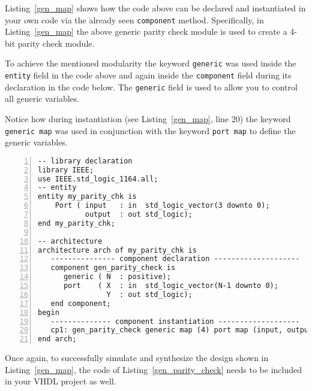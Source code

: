 Listing~\ref{gen_map} shows how the code above can be declared and instantiated in your own code via the already seen \texttt{component} method. Specifically, in Listing~\ref{gen_map} the above generic parity check module is used to create a 4-bit parity check module.

To achieve the mentioned modularity the keyword \texttt{generic} was used inside the \texttt{entity} field in the code above and again inside the \texttt{component} field during its declaration in the code below. The \texttt{generic} field is used to allow you to control all generic variables.

Notice how during instantiation (see Listing~\ref{gen_map}, line 20) the keyword \texttt{generic map} was used in conjunction with the keyword \texttt{port map} to define the generic variables.

\noindent
\begin{minipage}{0.99\linewidth}
\begin{lstlisting}[numbers=left, label=gen_map, caption=Use of \texttt{generic} for the construct of a generic parity check code.]
-- library declaration
library IEEE;
use IEEE.std_logic_1164.all;
-- entity
entity my_parity_chk is
    Port ( input   : in  std_logic_vector(3 downto 0);
           output  : out std_logic);
end my_parity_chk;

-- architecture
architecture arch of my_parity_chk is
   --------------- component declaration --------------------
   component gen_parity_check is
      generic ( N  : positive);
      port    ( X  : in  std_logic_vector(N-1 downto 0);
                Y  : out std_logic);
   end component;
begin
   -------------- component instantiation -------------------
   cp1: gen_parity_check generic map (4) port map (input, output);
end arch;

\end{lstlisting}
\end{minipage}

Once again, to successfully simulate and synthesize the design shown in Listing~\ref{gen_map}, the code of Listing~\ref{gen_parity_check} needs to be included in your VHDL project as well.

